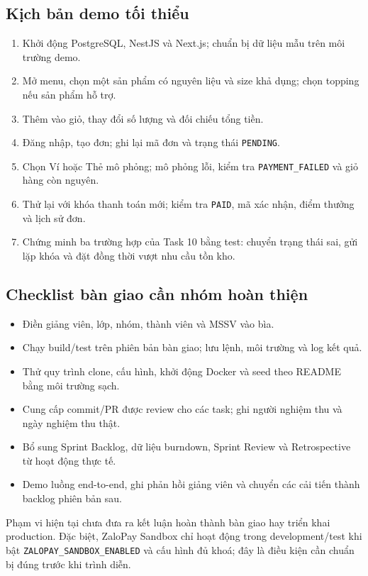 \subsection{Kịch bản demo tối thiểu}
\begin{enumerate}
\item Khởi động PostgreSQL, NestJS và Next.js; chuẩn bị dữ liệu mẫu trên môi trường demo.
\item Mở menu, chọn một sản phẩm có nguyên liệu và size khả dụng; chọn topping nếu sản phẩm hỗ trợ.
\item Thêm vào giỏ, thay đổi số lượng và đối chiếu tổng tiền.
\item Đăng nhập, tạo đơn; ghi lại mã đơn và trạng thái \texttt{PENDING}.
\item Chọn Ví hoặc Thẻ mô phỏng; mô phỏng lỗi, kiểm tra \texttt{PAYMENT\_FAILED} và giỏ hàng còn nguyên.
\item Thử lại với khóa thanh toán mới; kiểm tra \texttt{PAID}, mã xác nhận, điểm thưởng và lịch sử đơn.
\item Chứng minh ba trường hợp của Task 10 bằng test: chuyển trạng thái sai, gửi lặp khóa và đặt đồng thời vượt nhu cầu tồn kho.
\end{enumerate}

\subsection{Checklist bàn giao cần nhóm hoàn thiện}
\begin{itemize}[label=$\square$]
\item Điền giảng viên, lớp, nhóm, thành viên và MSSV vào bìa.
\item Chạy build/test trên phiên bản bàn giao; lưu lệnh, môi trường và log kết quả.
\item Thử quy trình clone, cấu hình, khởi động Docker và seed theo README bằng môi trường sạch.
\item Cung cấp commit/PR được review cho các task; ghi người nghiệm thu và ngày nghiệm thu thật.
\item Bổ sung Sprint Backlog, dữ liệu burndown, Sprint Review và Retrospective từ hoạt động thực tế.
\item Demo luồng end-to-end, ghi phản hồi giảng viên và chuyển các cải tiến thành backlog phiên bản sau.
\end{itemize}

Phạm vi hiện tại chưa đưa ra kết luận hoàn thành bàn giao hay triển khai production.
Đặc biệt, ZaloPay Sandbox chỉ hoạt động trong development/test khi bật
\texttt{ZALOPAY\_SANDBOX\_ENABLED} và cấu hình đủ khoá; đây là điều kiện cần chuẩn bị đúng trước khi trình diễn.
